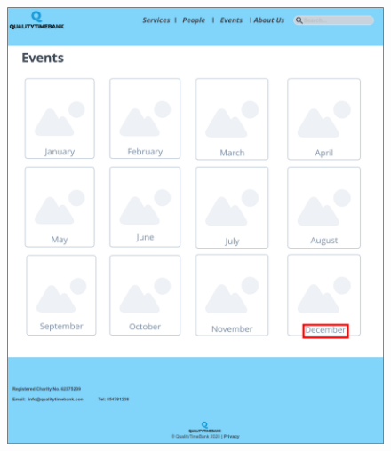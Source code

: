 \documentclass[a4paper, 11pt, parskip=half, headsepline]{scrreprt}
\begin{document}
\begin{figure}[H]
\begin{minipage}[t]{0.5\textwidth}
    	\includegraphics[width=0.9\linewidth, keepaspectratio]{scenarios/scenario-32}
    	\caption{}
    	\label{fig:scenario-32}
    \end{minipage}
\end{figure}
\end{document}
